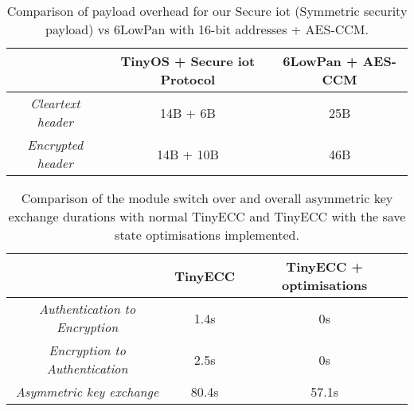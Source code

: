 \documentclass{mpaper}
\begin{document}
\begin{table*}[h!] %
  \begin{center} 
  \begin{tabular}{|c|c|c|} 
  \hline
                            & \textbf{TinyOS + Secure iot Protocol} & \textbf{6LowPan + AES-CCM} \\ \hline
  \textit{Cleartext header} & 14B + 6B                              & 25B                        \\ \hline
  \textit{Encrypted header} & 14B + 10B                             & 46B                        \\ \hline
  \end{tabular}
  \caption[Table]{Comparison of payload overhead for our Secure iot (Symmetric security payload) vs 6LowPan with 16-bit addresses + AES-CCM.}
  \label{tab:pdu_sizes}
  \end{center}
\end{table*}

\begin{table*}[h!] %
  \begin{center} 
  \begin{tabular}{|c|c|c|} 
  \hline
                                        & \textbf{TinyECC} & \textbf{TinyECC + optimisations} \\ \hline
  \textit{Authentication to Encryption} & 1.4s             & 0s                      \\ \hline
  \textit{Encryption to Authentication} & 2.5s             & 0s                      \\ \hline
  \textit{Asymmetric key exchange}      & 80.4s            & 57.1s                     \\ \hline
  \end{tabular}
  \caption[Table]{Comparison of the module switch over and overall asymmetric key exchange durations with normal TinyECC and TinyECC with the save state optimisations implemented.}
  \label{tab:ECC_optimisations}
  \end{center}
\end{table*}
\end{document}
